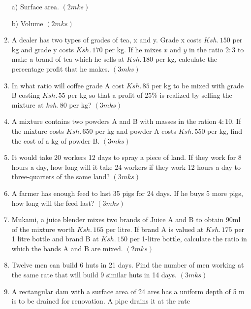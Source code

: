 \documentclass[
  a4paperpaper,
]{scrbook}
\begin{document}
\begin{tcolorbox}
\begin{enumerate}
  a) Surface area. \hspace{11 cm} \((2mks)\)

  b) Volume \hspace{12 cm} \((2mks)\)
\item
  A dealer has two types of grades of tea, x and y. Grade x costs
  \(Ksh.\, 150\) per kg and grade y costs \(Ksh.\, 170\) per kg. If he
  mixes \(x\) and \(y\) in the ratio \(2:3\) to make a brand of tea
  which he sells at \(Ksh.\, 180\) per kg, calculate the percentage
  profit that he makes.\hspace{2.5cm} \((3 mks)\)
\item
  In what ratio will coffee grade A cost \(Ksh.\, 85\) per kg to be
  mixed with grade B costing \(Ksh.\,55\) per kg so that a profit of
  25\% is realized by selling the mixture at \(ksh.\,80\) per kg?
  \hspace{14.2cm} \((3mks)\)
\item
  A mixture contains two powders A and B with masses in the ration
  \(4: 10\). If the mixture costs \(Ksh.\, 650\) per kg and powder A
  costs \(Ksh. \,550\) per kg, find the cost of a kg of powder B.
  \hspace{14.1 cm} \((3 mks)\)
\item
  It would take 20 workers 12 days to spray a piece of land. If they
  work for 8 hours a day, how long will it take 24 workers if they work
  12 hours a day to three-quarters of the same land? \hspace{14.3cm}
  \((3mks)\)
\item
  A farmer has enough feed to last 35 pigs for 24 days. If he buys 5
  more pigs, how long will the feed last? \hspace{12.5 cm} \((3mks)\)
\item
  Mukami, a juice blender mixes two brands of Juice A and B to obtain
  90ml of the mixture worth \(Ksh.\, 165\) per litre. If brand A is
  valued at \(Ksh.\, 175\) per 1 litre bottle and brand B at
  \(Ksh.\, 150\) per 1-litre bottle, calculate the ratio in which the
  bands A and B are mixed.\hspace{3cm} \((2mks)\)
\item
  Twelve men can build 6 huts in 21 days. Find the number of men working
  at the same rate that will build 9 similar huts in 14 days.
  \hspace{8.5cm} \((3mks)\)
\item
  A rectangular dam with a surface area of 24 ares has a uniform depth
  of 5 m is to be drained for renovation. A pipe drains it at the rate

\end{enumerate}
\end{tcolorbox}
\end{document}
